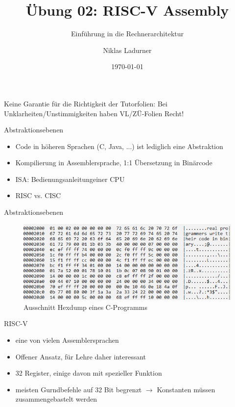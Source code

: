 \documentclass[
  german,            %
  aspectratio=169,    %
]{tumbeamer}
\title{Übung 02: RISC-V Assembly}
\subtitle{Einführung in die Rechnerarchitektur}
\author{Niklas Ladurner}
\institute{\theChairName\\\theDepartmentName\\\theUniversityName}
\date[\today]{\today}
\begin{document}
\maketitle

\begin{frame}[c]{}{}
  \begin{center}
    \LARGE  Keine Garantie für die Richtigkeit der Tutorfolien: Bei Unklarheiten/Unstimmigkeiten 
    haben VL/ZÜ-Folien Recht!
  \end{center}
\end{frame}

\begin{frame}[c]{Abstraktionsebenen}{}
  \begin{itemize}
    \item Code in höheren Sprachen (C, Java, ...) ist lediglich eine Abstraktion 
    \item Kompilierung in Assemblersprache, 1:1 Übersetzung in Binärcode
    \item ISA: \glqq Bedienungsanleitung\grqq\;einer CPU
    \item RISC vs. CISC
  \end{itemize}
\end{frame}

\begin{frame}[c]{Abstraktionsebenen}{}
  \begin{figure}[h]
  \includegraphics[width=\textwidth]{w02_hexdump.png}
  \caption{Ausschnitt Hexdump eines C-Programms}
  \end{figure}
\end{frame}

\begin{frame}[c]{RISC-V}{}
    \begin{itemize}
      \item eine von vielen Assemblersprachen
      \item Offener Ansatz, für Lehre daher interessant
      \item 32 Register, einige davon mit spezieller Funktion
      \item meisten Gurndbefehle auf 32 Bit begrenzt $\rightarrow$ Konstanten müssen zusammengebastelt werden
    \end{itemize}
\end{frame}
\end{document}
